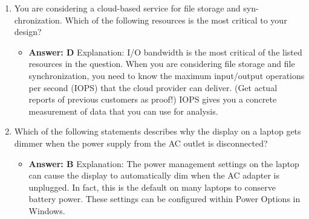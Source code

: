 \documentclass{article}
\begin{document}
\begin{enumerate}
\begin{itemize}
    \end{itemize}
     \item You are considering a cloud-based service for file storage and syn-
chronization. Which of the following resources is the most critical
to your design?
    \begin{itemize}
        \item \textbf{Answer: D}
Explanation: I/O bandwidth is the most critical of the listed resources in the question.
When you are considering file storage and file synchronization, you need to know
the maximum input/output operations per second (IOPS) that the cloud provider can
deliver. (Get actual reports of previous customers as proof!) IOPS gives you a concrete
measurement of data that you can use for analysis.
    \end{itemize}
     \item Which of the following statements describes why the display on a
laptop gets dimmer when the power supply from the AC outlet is
disconnected?
    \begin{itemize}
        \item \textbf{Answer: B}
Explanation: The power management settings on the laptop can cause the display
to automatically dim when the AC adapter is unplugged. In fact, this is the default
on many laptops to conserve battery power. These settings can be configured within
Power Options in Windows.
    \end{itemize}
     
\end{enumerate}
\end{document}
